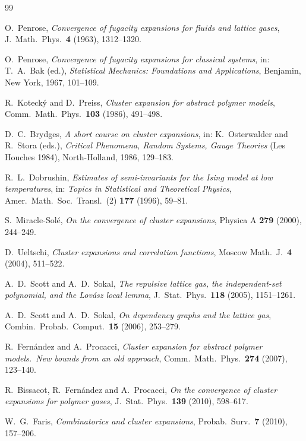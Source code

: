 \documentclass[11pt]{article}
\theoremstyle{definition}
\theoremstyle{remark}
\begin{document}
\begin{thebibliography}{99}

O.~Penrose,
\emph{Convergence of fugacity expansions for fluids and lattice gases},
J.~Math.\ Phys.\ \textbf{4} (1963), 1312--1320.

O.~Penrose,
\emph{Convergence of fugacity expansions for classical systems},
in: T.~A.~Bak (ed.), \emph{Statistical Mechanics: Foundations and
Applications}, Benjamin, New York, 1967, 101--109.

R.~Koteck\'y and D.~Preiss,
\emph{Cluster expansion for abstract polymer models},
Comm.\ Math.\ Phys.\ \textbf{103} (1986), 491--498.

D.~C.~Brydges,
\emph{A short course on cluster expansions},
in: K.~Osterwalder and R.~Stora (eds.), \emph{Critical Phenomena, Random
Systems, Gauge Theories} (Les Houches 1984), North-Holland, 1986, 129--183.

R.~L.~Dobrushin,
\emph{Estimates of semi-invariants for the Ising model at low temperatures},
in: \emph{Topics in Statistical and Theoretical Physics}, Amer.\ Math.\ Soc.\
Transl.\ (2) \textbf{177} (1996), 59--81.

S.~Miracle-Sol\'e,
\emph{On the convergence of cluster expansions},
Physica A \textbf{279} (2000), 244--249.

D.~Ueltschi,
\emph{Cluster expansions and correlation functions},
Moscow Math.\ J.\ \textbf{4} (2004), 511--522.

A.~D.~Scott and A.~D.~Sokal,
\emph{The repulsive lattice gas, the independent-set polynomial, and the
Lov\'asz local lemma},
J.~Stat.\ Phys.\ \textbf{118} (2005), 1151--1261.

A.~D.~Scott and A.~D.~Sokal,
\emph{On dependency graphs and the lattice gas},
Combin.\ Probab.\ Comput.\ \textbf{15} (2006), 253--279.

R.~Fern\'andez and A.~Procacci,
\emph{Cluster expansion for abstract polymer models.\ New bounds from an old
approach},
Comm.\ Math.\ Phys.\ \textbf{274} (2007), 123--140.

R.~Bissacot, R.~Fern\'andez and A.~Procacci,
\emph{On the convergence of cluster expansions for polymer gases},
J.~Stat.\ Phys.\ \textbf{139} (2010), 598--617.

W.~G.~Faris,
\emph{Combinatorics and cluster expansions},
Probab.\ Surv.\ \textbf{7} (2010), 157--206.


\end{thebibliography}
\end{document}
